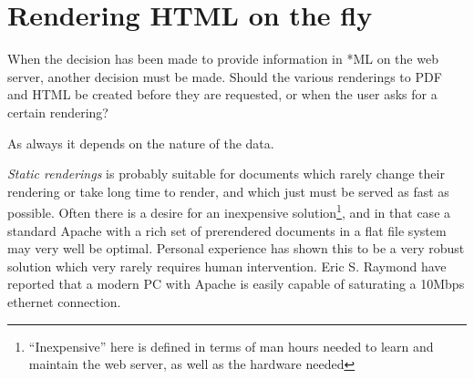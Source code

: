 \section{Rendering HTML on the fly}


When the decision has been made to provide information in *ML on the
web server, another decision must be made.  Should the various
renderings to PDF and HTML be created before they are requested, or
when the user asks for a certain rendering?


      




As always it depends on the nature of the data.

\textit{Static renderings} is probably suitable for documents which
rarely change their rendering or take long time to render, and which
just must be served as fast as possible.  Often there is a desire for
an inexpensive solution\footnote{``Inexpensive'' here is defined in
  terms of man hours needed to learn and maintain the web server, as
  well as the hardware needed}, and in that case a standard Apache
with a rich set of prerendered documents in a flat file system may
very well be optimal.  Personal experience has shown this to be a very
robust solution which very rarely requires human intervention.
Eric S. Raymond have reported that a modern PC with Apache is
easily capable of saturating a 10Mbps ethernet connection.


